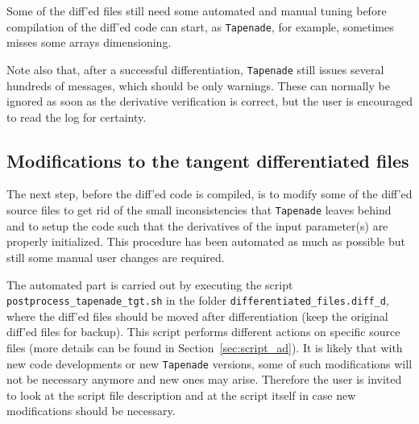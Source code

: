 Some of the diff'ed files still need some automated and manual tuning before compilation of the diff'ed code can start, as {\tt Tapenade}, for example, sometimes misses some arrays dimensioning.

Note also that, after a successful differentiation, {\tt Tapenade} still issues several hundreds of messages, which should be only warnings. These can normally be ignored as soon as the derivative verification is correct, but the user is encouraged to read the log for certainty.

\subsection{Modifications to the tangent differentiated files}\label{sec:diff_files}

The next step, before the diff'ed code is compiled, is to modify some of the diff'ed source files to get rid of the small inconsistencies that {\tt Tapenade} leaves behind and to setup the code such that the derivatives of the input parameter(s) are properly initialized. This procedure has been automated as much as possible but still some manual user changes are required.

\begin{sloppypar}
The automated part is carried out by executing the script {\tt postprocess\_tapenade\_tgt.sh} in the folder {\tt differentiated\_files.diff\_d}, where the diff'ed files should be moved after differentiation (keep the original diff'ed files for backup). This script performs different actions on specific source files (more details can be found in Section~\ref{sec:script_ad}). It is likely that with new code developments or new {\tt Tapenade} versions, some of such modifications will not be necessary anymore and new ones may arise. Therefore the user is invited to look at the script file description and at the script itself in case new modifications should be necessary.
\end{sloppypar}

